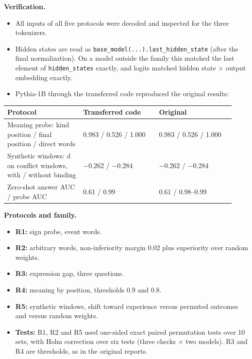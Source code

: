 \documentclass[11pt]{article}
\begin{document}
\textbf{Verification.}
\begin{itemize}
\item All inputs of all five protocols were decoded and inspected for the three tokenizers.
\item Hidden states are read as \texttt{base\_model(...).last\_hidden\_state} (after the final normalization). On a model outside the family this matched the last element of \texttt{hidden\_states} exactly, and logits matched hidden state $\times$ output embedding exactly.
\item Pythia-1B through the transferred code reproduced the original results:
\end{itemize}

\begin{center}\small\begin{tabular}{p{0.31\linewidth} p{0.31\linewidth} p{0.31\linewidth}}\hline
\textbf{Protocol} & \textbf{Transferred code} & \textbf{Original} \\ \hline
Meaning probe: kind position / final position / direct words & 0.983 / 0.526 / 1.000 & 0.983 / 0.526 / 1.000 \\
Synthetic windows: d on conflict windows, with / without binding & $-$0.262 / $-$0.284 & $-$0.262 / $-$0.284 \\
Zero-shot answer AUC / probe AUC & 0.61 / 0.99 & 0.61 / 0.98--0.99 \\
\hline\end{tabular}\end{center}

\textbf{Protocols and family.}
\begin{itemize}
\item \textbf{R1:} sign probe, event words.
\item \textbf{R2:} arbitrary words, non-inferiority margin 0.02 plus superiority over random weights.
\item \textbf{R3:} expression gap, three questions.
\item \textbf{R4:} meaning by position, thresholds 0.9 and 0.8.
\item \textbf{R5:} synthetic windows, shift toward experience versus permuted outcomes and versus random weights.
\item \textbf{Tests:} R1, R2 and R5 used one-sided exact paired permutation tests over 10 sets, with Holm correction over six tests (three checks $\times$ two models). R3 and R4 are thresholds, as in the original reports.
\end{itemize}
\end{document}
